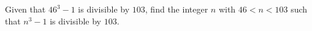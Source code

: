 Given that $46^3-1$ is divisible by $103$, find the integer $n$ with $46<n<103$ such that $n^3-1$ is divisible by $103$.

